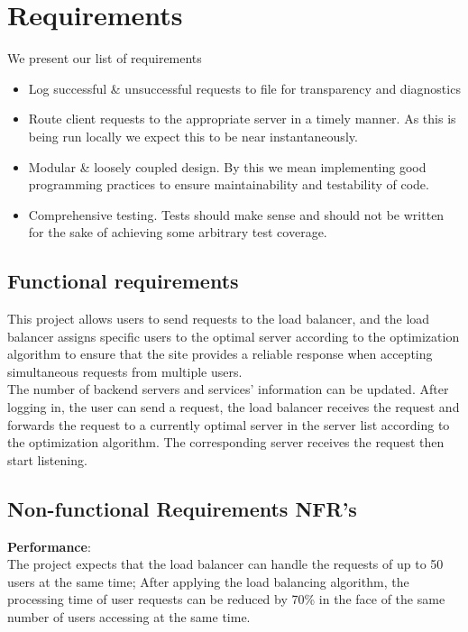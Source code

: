 \documentclass{article}
\begin{document}
\section{Requirements}
We present our list of requirements 
\begin{itemize}
    \item Log successful \& unsuccessful requests to file for transparency and diagnostics 
    \item Route client requests to the appropriate server in a timely manner. As this is being run locally we expect this to be near instantaneously.
    \item Modular \& loosely coupled design. By this we mean implementing good programming practices to ensure maintainability and testability of code.
    \item Comprehensive testing. Tests should make sense and should not be written for the sake of achieving some arbitrary test coverage. 
\end{itemize}
\subsection{Functional requirements}
This project allows users to send requests to the load balancer, and the load balancer assigns specific users to the optimal server according to the optimization algorithm to ensure that the site provides a reliable response when accepting simultaneous requests from multiple users. \\

\noindent The number of backend servers and services’ information can be updated. After logging in, the user can send a request, the load balancer receives the request and forwards the request to a currently optimal server in the server list according to the optimization algorithm. The corresponding server receives the request then start listening. \\

\subsection{Non-functional Requirements NFR's}

\textbf{Performance}: \\
The project expects that the load balancer can handle the requests of up to 50 users at the same time; After applying the load balancing algorithm, the processing time of user requests can be reduced by 70\% in the face of the same number of users accessing at the same time. \\
\end{document}
